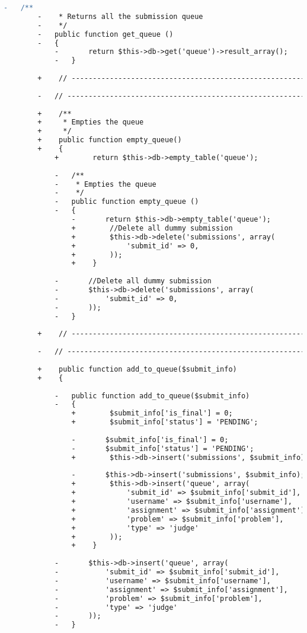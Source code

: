 \begin{lstlisting}[language=diff, caption=Perubahan pada kode Queue\_model.php]
		-	/**
		-	 * Returns all the submission queue
		-	 */
		-	public function get_queue ()
		-	{
			-		return $this->db->get('queue')->result_array();
			-	}
		
		+    // ------------------------------------------------------------------------
		
		-	// ------------------------------------------------------------------------
		
		+    /**
		+     * Empties the queue
		+     */
		+    public function empty_queue()
		+    {
			+        return $this->db->empty_table('queue');
			
			-	/**
			-	 * Empties the queue
			-	 */
			-	public function empty_queue ()
			-	{
				-		return $this->db->empty_table('queue');
				+        //Delete all dummy submission
				+        $this->db->delete('submissions', array(
				+            'submit_id' => 0,
				+        ));
				+    }
			
			-		//Delete all dummy submission
			-		$this->db->delete('submissions', array(
			-			'submit_id' => 0,
			-		));
			-	}
		
		+    // ------------------------------------------------------------------------
		
		-	// ------------------------------------------------------------------------
		
		+    public function add_to_queue($submit_info)
		+    {
			
			-	public function add_to_queue($submit_info)
			-	{
				+        $submit_info['is_final'] = 0;
				+        $submit_info['status'] = 'PENDING';
				
				-		$submit_info['is_final'] = 0;
				-		$submit_info['status'] = 'PENDING';
				+        $this->db->insert('submissions', $submit_info);
				
				-		$this->db->insert('submissions', $submit_info);
				+        $this->db->insert('queue', array(
				+            'submit_id' => $submit_info['submit_id'],
				+            'username' => $submit_info['username'],
				+            'assignment' => $submit_info['assignment'],
				+            'problem' => $submit_info['problem'],
				+            'type' => 'judge'
				+        ));
				+    }
			
			-		$this->db->insert('queue', array(
			-			'submit_id' => $submit_info['submit_id'],
			-			'username' => $submit_info['username'],
			-			'assignment' => $submit_info['assignment'],
			-			'problem' => $submit_info['problem'],
			-			'type' => 'judge'
			-		));
			-	}
		

\end{lstlisting}
